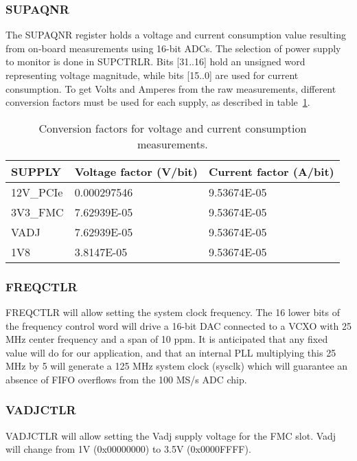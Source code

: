 \documentclass{article}
\begin{document}
\subsubsection{SUPAQNR}
The SUPAQNR register holds a voltage and current consumption value resulting from on-board measurements using 16-bit ADCs. The selection of power supply to monitor is done in SUPCTRLR. Bits [31..16] hold an unsigned word representing voltage magnitude, while bits [15..0] are used for current consumption. To get Volts and Amperes from the raw measurements, different conversion factors must be used for each supply, as described in table~\ref{tab:conv_fact}.

\begin{table}[htbp]
  \centering
  \begin{tabularx}{\textwidth}{|X|l|l|}
    \hline
    \textbf{SUPPLY} & \textbf{Voltage factor (V/bit)} & \textbf{Current factor (A/bit)} \\
    \hline
    \hline
    12V\_PCIe & 0.000297546 & 9.53674E-05 \\
    \hline
    3V3\_FMC & 7.62939E-05 & 9.53674E-05 \\
    \hline
    VADJ & 7.62939E-05 & 9.53674E-05 \\
    \hline
    1V8 & 3.8147E-05 & 9.53674E-05 \\
    \hline
  \end{tabularx}
  \caption{Conversion factors for voltage and current consumption measurements.}
  \label{tab:conv_fact}
\end{table}

\subsubsection{FREQCTLR}
FREQCTLR will allow setting the system clock frequency. The 16 lower bits of the frequency control word will drive a 16-bit DAC connected to a VCXO with 25 MHz center frequency and a span of 10 ppm. It is anticipated that any fixed value will do for our application, and that an internal PLL multiplying this 25 MHz by 5 will generate a 125 MHz system clock (sysclk) which will guarantee an absence of FIFO overflows from the 100 MS/s ADC chip.

\subsubsection{VADJCTLR}
VADJCTLR will allow setting the Vadj supply voltage for the FMC slot. Vadj will change from 1V (0x00000000) to 3.5V (0x0000FFFF). 
\end{document}
